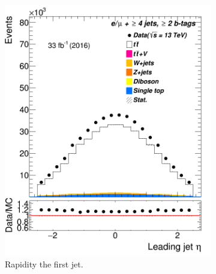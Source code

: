 \begin{figure}
	\begin{subfigure}{0.25\textwidth}
	\includegraphics[width=\linewidth]{ControlPlots_emujets_2016_4incl_2incl/jet0_eta_emujets_2016.png}
	\caption{Rapidity  the first jet.} \label{fig:e2}
   \end{subfigure}\hspace*{1.0cm}
  \begin{subfigure}{0.25\textwidth}

\end{subfigure}
\end{figure}
